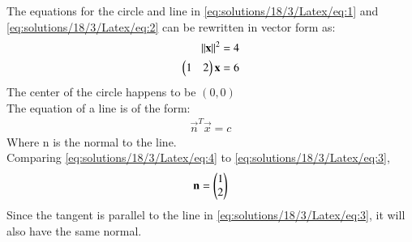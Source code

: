 The equations for the circle and line in \eqref{eq:solutions/18/3/Latex/eq:1} and \eqref{eq:solutions/18/3/Latex/eq:2} can be rewritten in vector form as:
\begin{align}
  \left\lVert\mathbf{x}\right\rVert^2 = 4 \\
  \begin{pmatrix}1 & 2\end{pmatrix}\mathbf{x} = 6 \label{eq:solutions/18/3/Latex/eq:3}
\end{align}
The center of the circle happens to be $(0, 0)$ \\
The equation of a line is of the form:
\begin{align}
  \vec{n}^T\vec{x} = c \label{eq:solutions/18/3/Latex/eq:4}
\end{align}
Where n is the normal to the line. \\
Comparing \eqref{eq:solutions/18/3/Latex/eq:4} to \eqref{eq:solutions/18/3/Latex/eq:3},
\begin{align}
  \mathbf{n} = \begin{pmatrix}1 \\ 2\end{pmatrix}
\end{align}
Since the tangent is parallel to the line in \eqref{eq:solutions/18/3/Latex/eq:3}, it will also have the same normal.

